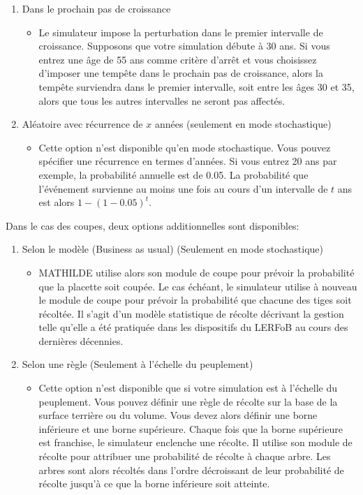 \documentclass[a4paper,12pt]{article}
\begin{document}
\begin{enumerate}
	\item Dans le prochain pas de croissance
	\begin{itemize}
		\item Le simulateur impose la perturbation dans le premier intervalle de croissance. Supposons que votre simulation débute à 30 ans. Si vous entrez une âge de 55 ans comme critère d'arrêt et vous choisissez d'imposer une tempête dans le prochain pas de croissance, alors la tempête surviendra dans le premier intervalle, soit entre les âges 30 et 35, alors que tous les autres intervalles ne seront pas affectés.
	\end{itemize}
	\item Aléatoire avec récurrence de $x$ années (seulement en mode stochastique)
	\begin{itemize}
		\item Cette option n'est disponible qu'en mode stochastique. Vous pouvez spécifier une récurrence en termes d'années. Si vous entrez 20 ans par exemple, la probabilité annuelle est de 0.05. La probabilité que l'événement survienne au moins une fois au cours d'un intervalle de $t$ ans est alors $1 - (1 - 0.05)^t$.
	\end{itemize}
\end{enumerate}
	
Dans le cas des coupes, deux options additionnelles sont disponibles:

\begin{enumerate}
	\item Selon le modèle (Business as usual) (Seulement en mode stochastique)
	\begin{itemize}
		\item MATHILDE utilise alors son module de coupe pour prévoir la probabilité que la placette soit coupée. Le cas échéant, le simulateur utilise à nouveau le module de coupe pour prévoir la probabilité que chacune des tiges soit récoltée. Il s'agit d'un modèle statistique de récolte décrivant la gestion telle qu'elle a été pratiquée dans les dispositifs du LERFoB au cours des dernières décennies. 
	\end{itemize}
	\item Selon une règle (Seulement à l'échelle du peuplement)
	\begin{itemize}
		\item Cette option n'est disponible que si votre simulation est à l'échelle du peuplement. Vous pouvez définir une règle de récolte sur la base de la surface terrière ou du volume. Vous devez alors définir une borne inférieure et une borne supérieure. Chaque fois que la borne supérieure est franchise, le simulateur enclenche une récolte. Il utilise son module de récolte pour attribuer une probabilité de récolte à chaque arbre. Les arbres sont alors récoltés dans l'ordre décroissant de leur probabilité de récolte jusqu'à ce que la borne inférieure soit atteinte.
	\end{itemize}
\end{enumerate}
\end{document}
